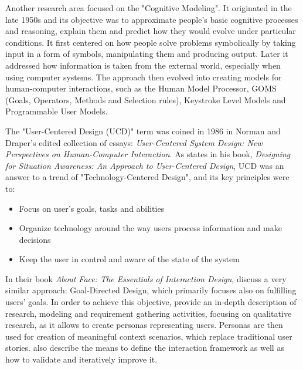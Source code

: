 \documentclass{article}
\begin{document}
Another research area focused on the "Cognitive Modeling". It originated in the late 1950s and its objective was to approximate people's basic cognitive processes and reasoning, explain them and predict how they would evolve under particular conditions. It first centered on how people solve problems symbolically by taking input in a form of symbols, manipulating them and producing output. Later it addressed how information is taken from the external world, especially when using computer systems. The approach then evolved into creating models for human-computer interactions, such as the Human Model Processor, GOMS (Goals, Operators, Methods and Selection rules), Keystroke Level Models and Programmable User Models.

The "User-Centered Design (UCD)" term was coined in 1986 in Norman and Draper's edited collection of essays: \textit{User-Centered System Design: New Perspectives on Human-Computer Interaction}. As \citet[9-11]{endsley2016designing} states in his book, \textit{Designing for Situation Awareness: An Approach to User-Centered Design}, UCD was an answer to a trend of "Technology-Centered Design", and its key principles were to:
\begin{itemize}
    \item Focus on user's goals, tasks and abilities
    \item Organize technology around the way users process information and make decisions
    \item Keep the user in control and aware of the state of the system
\end{itemize}

In their book \textit{About Face: The Essentials of Interaction Design}, \cite{cooper2014face} discuss a very similar approach: Goal-Directed Design, which primarily focuses also on fulfilling users' goals. In order to achieve this objective, \citeauthor{cooper2014face} provide an in-depth description of research, modeling and requirement gathering activities, focusing on qualitative research, as it allows to create personas representing users. Personas are then used for creation of meaningful context scenarios, which replace traditional user stories. \citeauthor{cooper2014face} also describe the means to define the interaction framework as well as how to validate and iteratively improve it.
\end{document}
